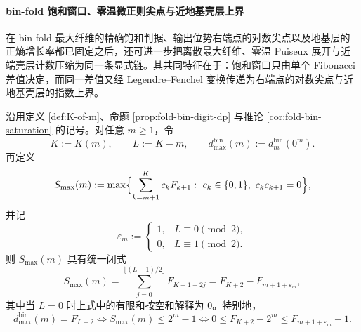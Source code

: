 \paragraph{bin-fold 饱和窗口、零温微正则尖点与近地基壳层上界}
在 bin-fold 最大纤维的精确饱和判据、输出位势右端点的对数尖点以及地基层的正熵增长率都已固定之后，还可进一步把离散最大纤维、零温 Puiseux 展开与近端壳层计数压缩为同一条显式链。其共同特征在于：饱和窗口只由单个 Fibonacci 差值决定，而同一差值又经 Legendre--Fenchel 变换传递为右端点的对数尖点与近地基壳层的指数上界。

\begin{theorem}[最大纤维饱和的差窗闭式与最大尾和公式]\label{thm:xi-foldbin-maxfiber-saturation-gap-window-closed}
沿用定义 \ref{def:K-of-m}、命题 \ref{prop:fold-bin-digit-dp} 与推论 \ref{cor:fold-bin-saturation} 的记号。对任意 \(m\ge 1\)，令
\[
K:=K(m),
\qquad
L:=K-m,
\qquad
d_{\max}^{\mathrm{bin}}(m):=d_m^{\mathrm{bin}}(0^m).
\]
再定义
\[
S_{\max}(m):=
\max\Bigl\{
\sum_{k=m+1}^{K}c_kF_{k+1}:\ c_k\in\{0,1\},\ c_kc_{k+1}=0
\Bigr\},
\]
并记
\[
\varepsilon_m:=
\begin{cases}
1,& L\equiv 0\pmod 2,\\
0,& L\equiv 1\pmod 2.
\end{cases}
\]
则 \(S_{\max}(m)\) 具有统一闭式
\[
\boxed{\;
S_{\max}(m)
=
\sum_{j=0}^{\lfloor (L-1)/2\rfloor}F_{K+1-2j}
=
F_{K+2}-F_{m+1+\varepsilon_m},
\;}
\]
其中当 \(L=0\) 时上式中的有限和按空和解释为 \(0\)。特别地，
\[
\boxed{\;
d_{\max}^{\mathrm{bin}}(m)=F_{L+2}
\iff
S_{\max}(m)\le 2^m-1
\iff
0\le F_{K+2}-2^m\le F_{m+1+\varepsilon_m}-1.
\;}
\]
\end{theorem}
